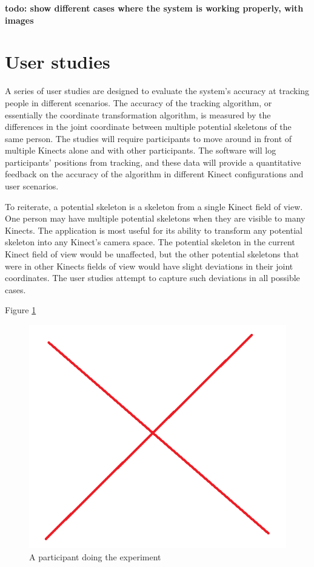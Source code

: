\documentclass{sigchi}
\begin{document}
\textbf{todo: show different cases where the system is working properly, with images}

\section{User studies}
\label{sec:user_studies}

A series of user studies are designed to evaluate the system's accuracy at tracking people in different scenarios. The accuracy of the tracking algorithm, or essentially the coordinate transformation algorithm, is measured by the differences in the joint coordinate between multiple potential skeletons of the same person. The studies will require participants to move around in front of multiple Kinects alone and with other participants. The software will log participants' positions from tracking, and these data will provide a quantitative feedback on the accuracy of the algorithm in different Kinect configurations and user scenarios.

To reiterate, a potential skeleton is a skeleton from a single Kinect field of view. One person may have multiple potential skeletons when they are visible to many Kinects. The application is most useful for its ability to transform any potential skeleton into any Kinect's camera space. The potential skeleton in the current Kinect field of view would be unaffected, but the other potential skeletons that were in other Kinects fields of view would have slight deviations in their joint coordinates. The user studies attempt to capture such deviations in all possible cases.

Figure \ref{fig:studies_example}

\begin{figure}[!h]
  \centering
  \includegraphics[width=0.9\columnwidth]{studies_example}
  \caption{A participant doing the experiment}
  \label{fig:studies_example}
\end{figure}
\end{document}
